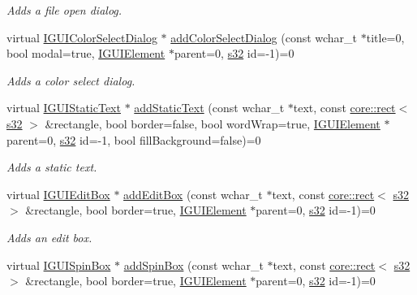 \begin{DoxyCompactItemize}
\begin{DoxyCompactList}\small\item\em Adds a file open dialog. \end{DoxyCompactList}\item 
virtual \hyperlink{classirr_1_1gui_1_1IGUIColorSelectDialog}{I\+G\+U\+I\+Color\+Select\+Dialog} $\ast$ \hyperlink{classirr_1_1gui_1_1IGUIEnvironment_a72858e14c66a1ee4687e6f51dedb0ce0}{add\+Color\+Select\+Dialog} (const wchar\+\_\+t $\ast$title=0, bool modal=true, \hyperlink{classirr_1_1gui_1_1IGUIElement}{I\+G\+U\+I\+Element} $\ast$parent=0, \hyperlink{namespaceirr_ac66849b7a6ed16e30ebede579f9b47c6}{s32} id=-\/1)=0
\begin{DoxyCompactList}\small\item\em Adds a color select dialog. \end{DoxyCompactList}\item 
virtual \hyperlink{classirr_1_1gui_1_1IGUIStaticText}{I\+G\+U\+I\+Static\+Text} $\ast$ \hyperlink{classirr_1_1gui_1_1IGUIEnvironment_adb56652b23932a391b08f710a9546ef3}{add\+Static\+Text} (const wchar\+\_\+t $\ast$text, const \hyperlink{classirr_1_1core_1_1rect}{core\+::rect}$<$ \hyperlink{namespaceirr_ac66849b7a6ed16e30ebede579f9b47c6}{s32} $>$ \&rectangle, bool border=false, bool word\+Wrap=true, \hyperlink{classirr_1_1gui_1_1IGUIElement}{I\+G\+U\+I\+Element} $\ast$parent=0, \hyperlink{namespaceirr_ac66849b7a6ed16e30ebede579f9b47c6}{s32} id=-\/1, bool fill\+Background=false)=0
\begin{DoxyCompactList}\small\item\em Adds a static text. \end{DoxyCompactList}\item 
virtual \hyperlink{classirr_1_1gui_1_1IGUIEditBox}{I\+G\+U\+I\+Edit\+Box} $\ast$ \hyperlink{classirr_1_1gui_1_1IGUIEnvironment_ab46cdfa5f746932166ac4ccfa86a70eb}{add\+Edit\+Box} (const wchar\+\_\+t $\ast$text, const \hyperlink{classirr_1_1core_1_1rect}{core\+::rect}$<$ \hyperlink{namespaceirr_ac66849b7a6ed16e30ebede579f9b47c6}{s32} $>$ \&rectangle, bool border=true, \hyperlink{classirr_1_1gui_1_1IGUIElement}{I\+G\+U\+I\+Element} $\ast$parent=0, \hyperlink{namespaceirr_ac66849b7a6ed16e30ebede579f9b47c6}{s32} id=-\/1)=0
\begin{DoxyCompactList}\small\item\em Adds an edit box. \end{DoxyCompactList}\item 
virtual \hyperlink{classirr_1_1gui_1_1IGUISpinBox}{I\+G\+U\+I\+Spin\+Box} $\ast$ \hyperlink{classirr_1_1gui_1_1IGUIEnvironment_ab7deca80cf9b0422fba30985612c3c99}{add\+Spin\+Box} (const wchar\+\_\+t $\ast$text, const \hyperlink{classirr_1_1core_1_1rect}{core\+::rect}$<$ \hyperlink{namespaceirr_ac66849b7a6ed16e30ebede579f9b47c6}{s32} $>$ \&rectangle, bool border=true, \hyperlink{classirr_1_1gui_1_1IGUIElement}{I\+G\+U\+I\+Element} $\ast$parent=0, \hyperlink{namespaceirr_ac66849b7a6ed16e30ebede579f9b47c6}{s32} id=-\/1)=0

\end{DoxyCompactItemize}
